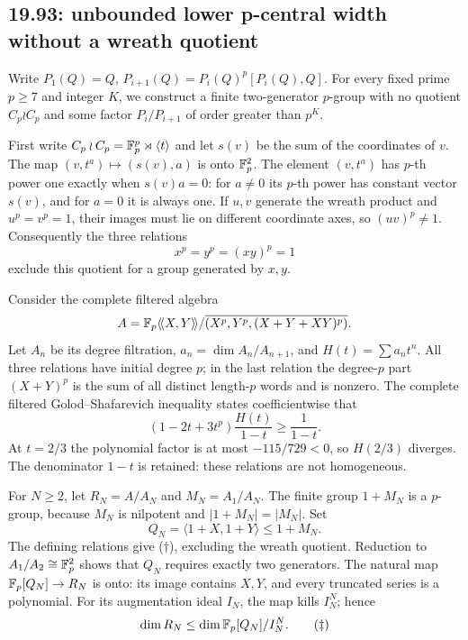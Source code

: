 \subsection{19.93: unbounded lower p-central width without a wreath quotient}
\label{cand:19.93}
Write \(P_1(Q)=Q\), \(P_{i+1}(Q)=P_i(Q)^p[P_i(Q),Q]\).
For every fixed prime \(p\ge7\) and integer \(K\), we construct a
finite two-generator \(p\)-group with no quotient \(C_p\wr C_p\)
and some factor \(P_i/P_{i+1}\) of order greater than \(p^K\).

First write \(C_p\wr C_p=\mathbb F_p^p\rtimes\langle t\rangle\) and let
\(s(v)\) be the sum of the coordinates of \(v\).
The map \((v,t^a)\mapsto(s(v),a)\) is onto \(\mathbb F_p^2\).
The element \((v,t^a)\) has \(p\)-th power one exactly when
\(s(v)a=0\): for \(a\ne0\) its \(p\)-th power has constant vector
\(s(v)\), and for \(a=0\) it is always one.
If \(u,v\) generate the wreath product and \(u^p=v^p=1\), their
images must lie on different coordinate axes, so \((uv)^p\ne1\).
Consequently the three relations
\[
 x^p=y^p=(xy)^p=1                                  \tag{\(\dagger\)}
\]
exclude this quotient for a group generated by \(x,y\).

Consider the complete filtered algebra
\[
 A=\mathbb F_p\langle\!\langle X,Y\rangle\!\rangle/
 \overline{(X^p,Y^p,(X+Y+XY)^p)}.
\]
Let \(A_n\) be its degree filtration, \(a_n=\dim A_n/A_{n+1}\),
and \(H(t)=\sum a_nt^n\).
All three relations have initial degree \(p\); in the last relation
the degree-\(p\) part \((X+Y)^p\) is the sum of all distinct
length-\(p\) words and is nonzero.
The complete filtered Golod--Shafarevich inequality
\cite[Theorem~2.6]{ershov-gs} states coefficientwise that
\[
 (1-2t+3t^p)\frac{H(t)}{1-t}\ge\frac1{1-t}.
\]
At \(t=2/3\) the polynomial factor is at most \(-115/729<0\),
so \(H(2/3)\) diverges.
The denominator \(1-t\) is retained: these relations are not homogeneous.

For \(N\ge2\), let \(R_N=A/A_N\) and \(M_N=A_1/A_N\).
The finite group \(1+M_N\) is a \(p\)-group, because \(M_N\) is
nilpotent and \(|1+M_N|=|M_N|\). Set
\[
 Q_N=\langle1+X,1+Y\rangle\le1+M_N.
\]
The defining relations give (\(\dagger\)), excluding the wreath
quotient. Reduction to \(A_1/A_2\cong\mathbb F_p^2\) shows that \(Q_N\)
requires exactly two generators.
The natural map \(\mathbb F_p[Q_N]\to R_N\) is onto: its image contains
\(X,Y\), and every truncated series is a polynomial.
For its augmentation ideal \(I_N\), the map kills \(I_N^N\);
hence
\[
 \dim R_N\le\dim\mathbb F_p[Q_N]/I_N^N.                    \tag{\(\ddagger\)}
\]


